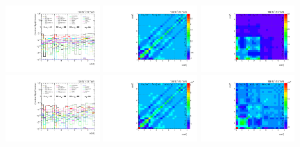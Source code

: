 \begin{figure}[htb]
\begin{center}
 \includegraphics[width=0.32\textwidth]{fig_fullRun2UL/unfolding/combined/deltaSystCombinedlog_rebinnedB_b1r_mttbar.pdf}
 \includegraphics[width=0.32\textwidth]{fig_fullRun2UL/unfolding/combined/StatCovMatrix_rebinnedB_b1r_mttbar.pdf}
 \includegraphics[width=0.32\textwidth]{fig_fullRun2UL/unfolding/combined/TotalSystCovMatrix_rebinnedB_b1r_mttbar.pdf} \\
 \includegraphics[width=0.32\textwidth]{fig_fullRun2UL/unfolding/combined/deltaSystCombinedlogNorm_rebinnedB_b1r_mttbar.pdf}
 \includegraphics[width=0.32\textwidth]{fig_fullRun2UL/unfolding/combined/StatCovMatrixNorm_rebinnedB_b1r_mttbar.pdf}
 \includegraphics[width=0.32\textwidth]{fig_fullRun2UL/unfolding/combined/TotalSystCovMatrixNorm_rebinnedB_b1r_mttbar.pdf} \\

\end{center}
\end{figure}
